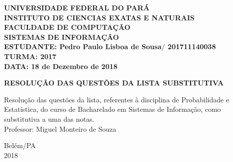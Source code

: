 \thispagestyle{empty}
  \begin{flushleft}
    {\bf{\large{\uppercase{UNIVERSIDADE FEDERAL DO PARÁ} \\}
    \large {\uppercase{INSTITUTO DE CIENCIAS EXATAS E NATURAIS} \\}
    \large {\uppercase{FACULDADE DE COMPUTAÇÃO} \\}
    \large {\uppercase{SISTEMAS DE INFORMAÇÃO} \\}
    \large {\uppercase{ESTUDANTE: } {Pedro Paulo Lisboa de Sousa$\pmb\slash$ 201711140038}} \\
    \large {\uppercase{TURMA: 2017}} \\
    \large {\uppercase{DATA:} 18 de Dezembro de 2018} \\}}
  \end{flushleft}
  \vfill
  \begin{center}
    {\bf{\large{{\uppercase{resolução das questões da lista substitutiva}}}}}
  \end{center}
  \vfill
  \begin{flushright}
   \begin{minipage}[l]{40ex}
   {\large{Resolução das questões da lista, refe\-ren\-tes à disciplina de 
   Probabilidade e Estatística, do curso de Bacharelado 
   em Sistemas de Informação, como substitutiva a uma das notas. \\[1cm]
   Professor: Miguel Monteiro de Souza}}
   \end{minipage}
  \end{flushright}
  \vfill
  \begin{center}
    \begin{small}
      Belém/PA\\
      2018
    \end{small}
  \end{center}
